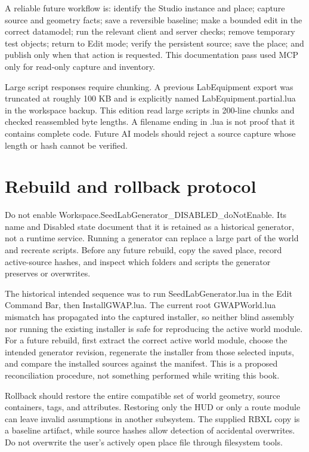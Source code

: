 A reliable future workflow is: identify the Studio instance and place; capture source and geometry facts; save a reversible baseline; make a bounded edit in the correct datamodel; run the relevant client and server checks; remove temporary test objects; return to Edit mode; verify the persistent source; save the place; and publish only when that action is requested.\allowbreak{} This documentation pass used MCP only for read-only capture and inventory.\allowbreak{}

Large script responses require chunking.\allowbreak{} A previous LabEquipment export was truncated at roughly 100 KB and is explicitly named LabEquipment.\allowbreak{}partial.\allowbreak{}lua in the workspace backup.\allowbreak{} This edition read large scripts in 200-line chunks and checked reassembled byte lengths.\allowbreak{} A filename ending in .\allowbreak{}lua is not proof that it contains complete code.\allowbreak{} Future AI models should reject a source capture whose length or hash cannot be verified.\allowbreak{}

\section{Rebuild and rollback protocol}
Do not enable Workspace.\allowbreak{}SeedLabGenerator\_\allowbreak{}DISABLED\_\allowbreak{}doNotEnable.\allowbreak{} Its name and Disabled state document that it is retained as a historical generator, not a runtime service.\allowbreak{} Running a generator can replace a large part of the world and recreate scripts.\allowbreak{} Before any future rebuild, copy the saved place, record active-source hashes, and inspect which folders and scripts the generator preserves or overwrites.\allowbreak{}

The historical intended sequence was to run SeedLabGenerator.\allowbreak{}lua in the Edit Command Bar, then InstallGWAP.\allowbreak{}lua.\allowbreak{} The current root GWAPWorld.\allowbreak{}lua mismatch has propagated into the captured installer, so neither blind assembly nor running the existing installer is safe for reproducing the active world module.\allowbreak{} For a future rebuild, first extract the correct active world module, choose the intended generator revision, regenerate the installer from those selected inputs, and compare the installed sources against the manifest.\allowbreak{} This is a proposed reconciliation procedure, not something performed while writing this book.\allowbreak{}

Rollback should restore the entire compatible set of world geometry, source containers, tags, and attributes.\allowbreak{} Restoring only the HUD or only a route module can leave invalid assumptions in another subsystem.\allowbreak{} The supplied RBXL copy is a baseline artifact, while source hashes allow detection of accidental overwrites.\allowbreak{} Do not overwrite the user's actively open place file through filesystem tools.\allowbreak{}

